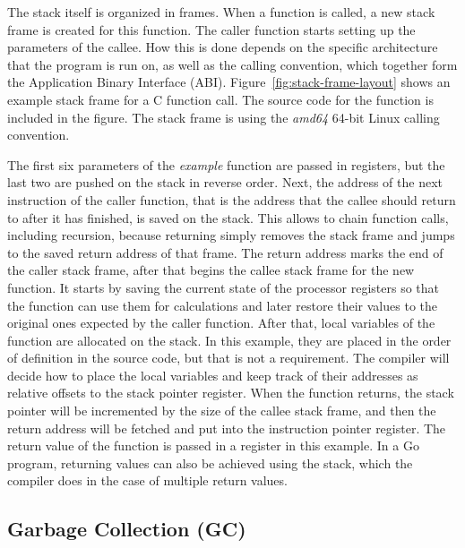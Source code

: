 

The stack itself is organized in frames.
When a function is called, a new stack frame is created for this function.
The caller function starts setting up the parameters of the callee.
How this is done depends on the specific architecture that the program is run on, as well as the calling convention,
which together form the Application Binary Interface (\acrshort{ABI}).
Figure~\ref{fig:stack-frame-layout} shows an example stack frame for a C function call.
The source code for the function is included in the figure.
The stack frame is using the \textit{amd64} 64-bit Linux calling convention.

The first six parameters of the \textit{example} function are passed in registers, but the last two are pushed on the
stack in reverse order.
Next, the address of the next instruction of the caller function, that is the address that the callee should return
to after it has finished, is saved on the stack.
This allows to chain function calls, including recursion, because returning simply removes the stack frame and jumps
to the saved return address of that frame.
The return address marks the end of the caller stack frame, after that begins the callee stack frame for the new
function.
It starts by saving the current state of the processor registers so that the function can use them for calculations and
later restore their values to the original ones expected by the caller function.
After that, local variables of the function are allocated on the stack.
In this example, they are placed in the order of definition in the source code, but that is not a requirement.
The compiler will decide how to place the local variables and keep track of their addresses as relative offsets to the
stack pointer register.
When the function returns, the stack pointer will be incremented by the size of the callee stack frame, and then the
return address will be fetched and put into the instruction pointer register.
The return value of the function is passed in a register in this example.
In a Go program, returning values can also be achieved using the stack, which the compiler does in the case of multiple
return values.





\subsection{Garbage Collection (GC)}\label{subsec:background:memory:gc}

